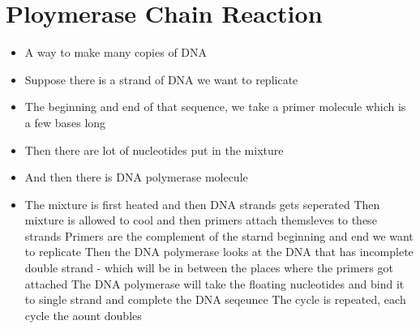 \documentclass{article}
\begin{document}
	\section{Ploymerase Chain Reaction}
	\begin{itemize}
		\item A way to make many copies of DNA
		\item Suppose there is a strand of DNA we want to replicate
		\item The beginning and end of that sequence, we take a primer molecule which is a few bases long
		\item Then there are lot of nucleotides put in the mixture
		\item And then there is DNA polymerase molecule
		\item The mixture is first heated and then DNA strands gets seperated
		Then mixture is allowed to cool and then primers attach themsleves to these strands
		Primers are the complement of the starnd beginning and end we want to replicate
		Then the DNA polymerase looks at the DNA that has incomplete double strand - which will be in between the places where the primers got attached
		The DNA polymerase will take the floating nucleotides and bind it to single strand and complete the DNA seqeunce
		The cycle is repeated, each cycle the aount doubles
	\end{itemize}
	
\end{document}
